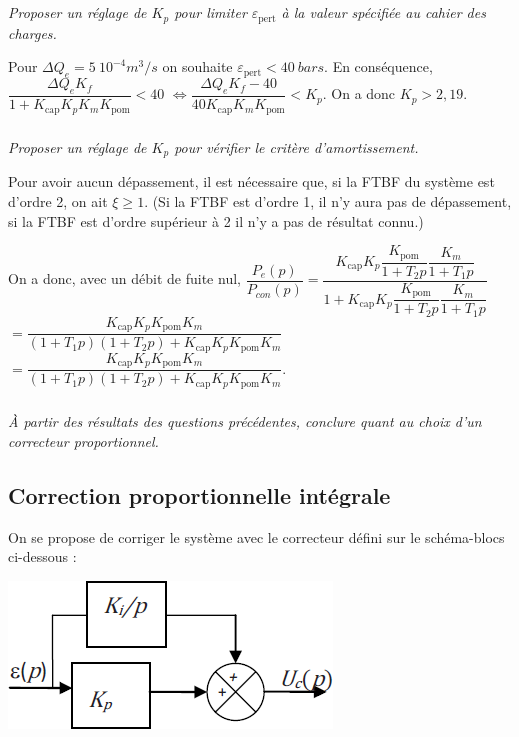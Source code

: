 \documentclass[10pt,fleqn]{article} %
\begin{document}
\begin{multicols}{2}
\begin{corrige}
\end{corrige}
\else
\fi

\subparagraph{}
\textit{Proposer un réglage de $K_p$ pour limiter $\varepsilon_{\text{pert}}$ à la valeur spécifiée au cahier des charges.}
\ifprof
\begin{corrige}
Pour $\Delta Q_e = \SI{5}{10^{-4} m^3/s}$ on souhaite $\varepsilon_{\text{pert}} < \SI{40}{bars}$. En conséquence, 
$\dfrac{\Delta Q_e K_f}{1+K_{\text{cap}}K_pK_mK_{\text{pom}}} <40$ 
$\Leftrightarrow  \dfrac{\Delta Q_e K_f -40}{40K_{\text{cap}}K_mK_{\text{pom}}}<K_p$. On a donc $K_p>2,19$.
\end{corrige}
\else
\fi

\subparagraph{}
\textit{Proposer un réglage de $K_p$ pour vérifier le critère d’amortissement.}
\ifprof
\begin{corrige}
Pour avoir aucun dépassement, il est nécessaire que, si la FTBF du système est d'ordre 2, on ait $\xi\geq 1$. (Si la FTBF est d'ordre 1, il n'y aura pas de dépassement, si la FTBF est d'ordre supérieur à 2 il n'y a pas de résultat connu.)

On a donc, avec un débit de fuite nul, $\dfrac{P_e(p)}{P_{con}(p)}
=\dfrac{K_{\text{cap}}K_p\dfrac{K_{\text{pom}}}{1+T_2 p}\dfrac{K_{m}}{1+T_1 p}}{1+K_{\text{cap}}K_p\dfrac{K_{\text{pom}}}{1+T_2 p}\dfrac{K_{m}}{1+T_1 p}}$
$=\dfrac{K_{\text{cap}}K_pK_{\text{pom}} K_{m}}{\left(1+T_1 p\right)\left(1+T_2 p\right)+K_{\text{cap}}K_pK_{\text{pom}} K_{m}}$
$=\dfrac{K_{\text{cap}}K_pK_{\text{pom}} K_{m}}{\left(1+T_1 p\right)\left(1+T_2 p\right)+K_{\text{cap}}K_pK_{\text{pom}} K_{m}}$.

 
\end{corrige}
\else
\fi


\subparagraph{}
\textit{À partir des résultats des questions précédentes, conclure quant au choix d’un correcteur proportionnel.}
\ifprof
\begin{corrige}

\end{corrige}
\else
\fi

\subsection*{Correction proportionnelle intégrale}
On se propose de corriger le système avec le correcteur défini sur le schéma-blocs ci-dessous :
\begin{center}
\includegraphics[width=.4\linewidth]{images/fig_07}
\end{center}



\end{multicols}
\end{document}
